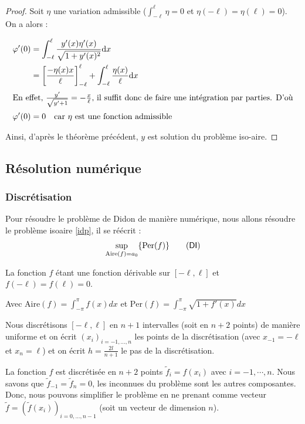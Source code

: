\documentclass[10pt,a4paper]{article}
\renewcommand{\d}{\mathrm{d}}
\newcommand{\A}{\mathrm{Aire}}
\newcommand{\p}{\mathrm{Per}}
\newcommand{\DI}{\textsf{DI}}
\theoremstyle{plain}
\theoremstyle{definition}
\begin{document}
\begin{proof}
Soit $\eta$ une variation admissible ($\int_{-\ell}^\ell\eta=0$ et $\eta(-\ell)=\eta(\ell)=0$). On a alors :

\begin{align*}
\varphi'(0) &= \int_{-\ell}^\ell \frac{y'(x)\eta'(x)}{\sqrt{1+y'(x)^2}}\d x\\
			&= \left[\frac{-\eta(x) x}{\ell}\right]_{-\ell}^\ell + \int_{-\ell}^\ell\frac{\eta(x)}{\ell}\d x\\
\intertext{En effet, $\frac{y'}{\sqrt{y'+1}}=-\frac{x}{\ell}$, il suffit donc de faire une intégration par parties. D'où}
\varphi'(0)&= 0\quad\text{car }\eta\text{ est une fonction admissible}
\end{align*}

Ainsi, d'après le théorème précédent, $y$ est solution du problème iso-aire.
\end{proof}







\subsection{Résolution numérique}

\subsubsection{Discrétisation}

Pour résoudre le problème de Didon de manière numérique, nous allons résoudre le problème isoaire \ref{idp}, il se réécrit :
\[ \sup_{\A(f)=a_0} \{ \p(f) \} \label{di}\tag{\DI} \]

La fonction $f$ étant une fonction dérivable sur $[-\ell, \ell]$ et $f(-\ell)=f(\ell)=0$.

Avec $\A(f) = \int_{-\pi}^{\pi}{f(x)}dx$ et $\p(f) = \int_{-\pi}^{\pi}{\sqrt{1+f'(x)}dx}$

Nous discrétisons $[-\ell, \ell]$ en $n+1$ intervalles (soit en $n+2$ points) de manière uniforme et on écrit $(x_i)_{i=-1,...,n}$ les points de la discrétisation (avec  $x_{-1}=-\ell$ et $x_n=\ell$) et on écrit $h=\frac{2l}{n+1}$ le pas de la discrétisation.

La fonction $f$ est discrétisée en $n+2$ points $\tilde{f}_i = f(x_i)$ avec $i=-1,\cdots,n$. Nous savons que $\tilde{f}_{-1} = \tilde{f}_n = 0$, les inconnues du problème sont les autres composantes. Donc, nous pouvons simplifier le problème en ne prenant comme vecteur $\tilde{f} = (\tilde{f}(x_i))_{i=0,...,n-1}$ (soit un vecteur de dimension $n$).
\end{document}
